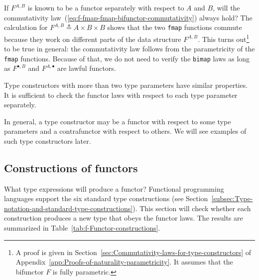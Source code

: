 If $F^{A,B}$ is known to be a functor separately with respect to
$A$ and $B$, will the commutativity law~(\ref{eq:f-fmap-fmap-bifunctor-commutativity})
always hold? The calculation for $F^{A,B}\triangleq A\times B\times B$
shows that the two \lstinline!fmap! functions commute because they
work on different parts of the data structure $F^{A,B}$. This turns
out\footnote{A proof is given in Section~\ref{sec:Commutativity-laws-for-type-constructors}
of Appendix~\ref{app:Proofs-of-naturality-parametricity}. It assumes
that the bifunctor $F$ is fully parametric.} to be true in general: the commutativity law follows from the parametricity
of the \lstinline!fmap! functions. Because of that, we do not need
to verify the \lstinline!bimap! laws as long as $F^{\bullet,B}$
and $F^{A,\bullet}$ are lawful functors.

Type constructors with more than two type parameters have similar
properties. It is sufficient to check the functor laws with respect
to each type parameter separately.

In general, a type constructor may be a functor with respect to some
type parameters and a contrafunctor with respect to others. We will
see examples of such type constructors later.

\subsection{Constructions of functors\label{subsec:f-Functor-constructions}}

What type expressions will produce a functor? Functional programming
languages support the six standard type constructions (see Section~\ref{subsec:Type-notation-and-standard-type-constructions}).
This section will check whether each construction produces a new type
that obeys the functor laws. The results are summarized in Table~\ref{tab:f-Functor-constructions}.

